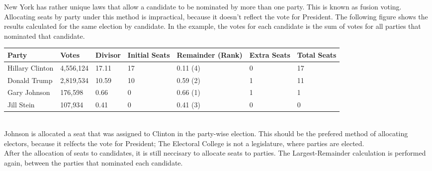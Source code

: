 \documentclass{article}
\begin{document}
    New York has rather unique laws that allow a candidate to be nominated by more than one party. This is known as fusion voting. Allocating seats by party under this method is impractical, because it doesn't reflect the vote for President. The following figure shows the results calculated for the same election by candidate. In the example, the votes for each candidate is the sum of votes for all parties that nominated that candidate.\\

    \begin{adjustbox}{center}
    \begin{tabular}{ |l|l|l|l|l|l|l| }
        \hline
        Party & Votes & Divisor & Initial Seats & Remainder (Rank) & Extra Seats & Total Seats \\
        \hline
        Hillary Clinton & 4,556,124 & 17.11 & 17 & 0.11 (4) & 0 & 17 \\
        \hline
        Donald Trump & 2,819,534 & 10.59 & 10 & 0.59 (2) & 1 & 11 \\
        \hline
        Gary Johnson & 176,598 & 0.66 & 0 & 0.66 (1) & 1 & 1 \\
        \hline
        Jill Stein & 107,934 & 0.41 & 0 & 0.41 (3) & 0 & 0 \\
        \hline
    \end{tabular}
    \end{adjustbox} \\

    Johnson is allocated a seat that was assigned to Clinton in the party-wise election. This should be the prefered method of allocating electors, because it relfects the vote for President; The Electoral College is not a legislature, where parties are elected.\\
    
    After the allocation of seats to candidates, it is still neccisary to allocate seats to parties. The Largest-Remainder calculation is performed again, between the parties that nominated each candidate.
\end{document}
